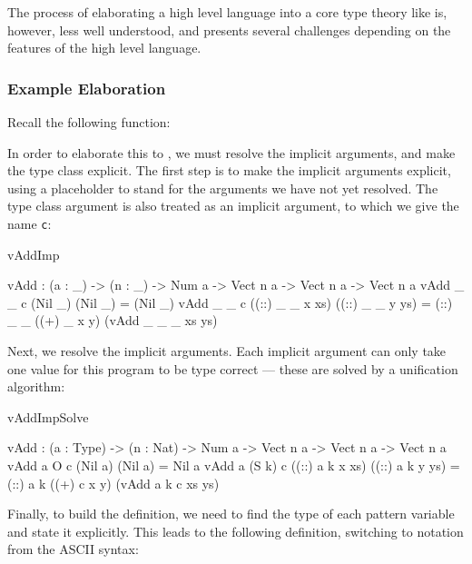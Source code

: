 The process of elaborating a high level language into a core type theory like \TT{} is,
however, less well understood, and presents several challenges depending on the
features of the high level language. 

\subsubsection{Example Elaboration}

Recall the following \Idris{} function:


\noindent
In order to elaborate
this to \TT{}, we must resolve the implicit arguments, and make the type class explicit.
The first step is to make the implicit arguments explicit, using a placeholder
to stand for the arguments we have not yet resolved. The type class argument is
also treated as an implicit argument, to which we give the name \texttt{c}:

\begin{SaveVerbatim}{vAddImp}

vAdd : (a : _) -> (n : _) -> Num a -> Vect n a -> Vect n a -> Vect n a
vAdd _ _ c (Nil _)         (Nil _)         = (Nil _)
vAdd _ _ c ((::) _ _ x xs) ((::) _ _ y ys) 
                = (::) _ _ ((+) _ x y) (vAdd _ _ _ xs ys)

\end{SaveVerbatim}

Next, we resolve the implicit arguments. Each implicit argument can only take
one value for this program to be type correct --- these are solved by a unification
algorithm:

\begin{SaveVerbatim}{vAddImpSolve}

vAdd : (a : Type) -> (n : Nat) -> Num a -> Vect n a -> Vect n a -> Vect n a
vAdd a O     c (Nil a)         (Nil a)         = Nil a
vAdd a (S k) c ((::) a k x xs) ((::) a k y ys) 
                = (::) a k ((+) c x y) (vAdd a k c xs ys)

\end{SaveVerbatim}

Finally, to build the \TT{} definition, we need to find the type of each
pattern variable and state it explicitly. This leads to the following
\TT{} definition, switching to \TT{} notation from the ASCII \Idris{}
syntax:

